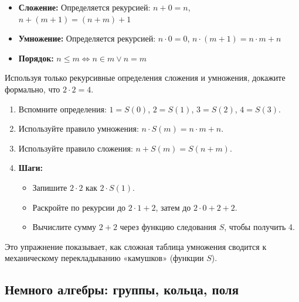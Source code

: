 \documentclass[11pt, a4paper]{extarticle}
\newcommand{\N}{{\mathbb N}}
\renewcommand{\le}{\leqslant}
\begin{document}
\begin{definition}[Арифметика на $\N$]
\begin{itemize}
    \item \textbf{Сложение:} Определяется рекурсией: $n + 0 = n$, $n + (m + 1) = (n + m) + 1$
    \item \textbf{Умножение:} Определяется рекурсией: $n \cdot 0 = 0$, $n \cdot (m + 1) = n \cdot m + n$
    \item \textbf{Порядок:} $n \le m \iff n \in m \lor n = m$
\end{itemize}
\end{definition}

\begin{exercise}[Арифметика Пеано: «2x2=4»]
    Используя только рекурсивные определения сложения и умножения, докажите формально, что $2 \cdot 2 = 4$.
    \begin{enumerate}
        \item Вспомните определения: $1 = S(0)$, $2 = S(1)$, $3 = S(2)$, $4 = S(3)$.
        \item Используйте правило умножения: $n \cdot S(m) = n \cdot m + n$.
        \item Используйте правило сложения: $n + S(m) = S(n + m)$.
        \item \textbf{Шаги:}
        \begin{itemize}
            \item Запишите $2 \cdot 2$ как $2 \cdot S(1)$.
            \item Раскройте по рекурсии до $2 \cdot 1 + 2$, затем до $2 \cdot 0 + 2 + 2$.
            \item Вычислите сумму $2+2$ через функцию следования $S$, чтобы получить 4.
        \end{itemize}
    \end{enumerate}
    Это упражнение показывает, как сложная таблица умножения сводится к механическому перекладыванию «камушков» (функции $S$).
    \end{exercise}

\subsection{Немного алгебры: группы, кольца, поля}
\end{document}
